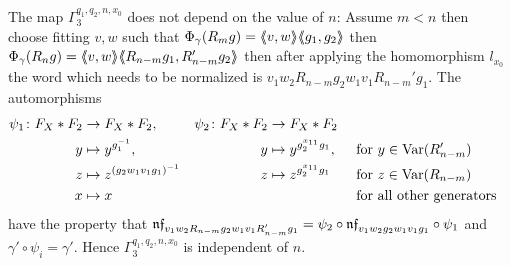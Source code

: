 \documentclass[a4paper,11pt]{amsart}
\begin{document}
 The map $\Gamma_3^{q_1,q_2,n,x_0}$ does not depend on the value of $n$: Assume $m<n$ then choose  
 fitting $v,w$ such that $\Phi_\gamma(R_mg)=\langle\negthickspace\langle v,w\rangle\negthickspace\rangle\langle\negthickspace\langle g_1,g_2\rangle\negthickspace\rangle$ then $\Phi_\gamma(R_ng)=\langle\negthickspace\langle v,w\rangle\negthickspace\rangle\langle\negthickspace\langle R_{n-m}g_1,R_{n-m}'g_2\rangle\negthickspace\rangle$ 
 then after applying the homomorphism $l_{x_0}$ 
 the word which needs to be normalized is $v_1w_2R_{n-m}g_2w_1v_1R_{n-m}'g_1$. The automorphisms
 \begin{align*}
 \psi_1 \colon F_X*F_2 &\to F_X*F_2, & \psi_2 \colon F_X*F_2 &\to F_X*F_2\\
 y &\mapsto y^{g_1^{-1}}, & y &\mapsto y^{g_2^{x_{11}}g_1}, & &\text{ for }y\in \textup{Var}(R_{n-m}')\\
 z &\mapsto z^{(g_2w_1v_1g_1)^{-1}}& z &\mapsto z^{g_2^{x_{11}}g_1}  & &\text{ for }z\in \textup{Var}(R_{n-m})\\
 x &\mapsto x & & & &\text{ for all other generators}
 \end{align*}
 have the property that $\mathfrak{nf}_{v_1w_2R_{n-m}g_2w_1v_1R_{n-m}'g_1} = \psi_2\circ\mathfrak{nf}_{v_1w_2g_2w_1v_1g_1}\circ \psi_1$ and 
 $\gamma' \circ \psi_i = \gamma'$. Hence $\Gamma_3^{q_1,q_2,n,x_0}$ is independent of $n$.
 
\end{document}
